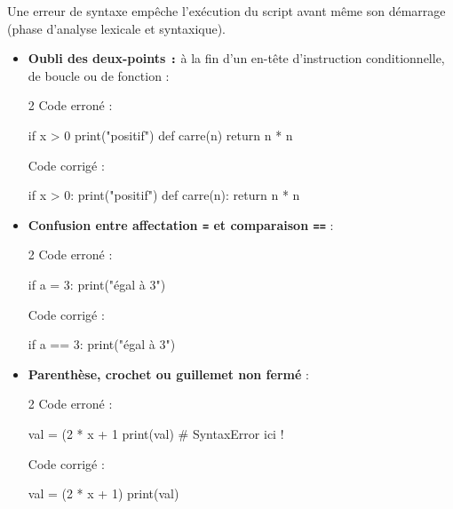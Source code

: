 \documentclass[11pt,a4paper]{article}
\begin{document}
\begin{tcolorbox}[left=0cm,title=\bf{\faBug \; 1. Erreurs de syntaxe (SyntaxError)},colbacktitle=cfond]
Une erreur de syntaxe empêche l'exécution du script avant même son démarrage (phase d'analyse lexicale et syntaxique).
\begin{itemize}
	\item[\textbullet] \textbf{Oubli des deux-points {\tt :}} à la fin d'un en-tête d'instruction conditionnelle, de boucle ou de fonction :
	\setlength{\multicolsep}{0pt}
	\begin{multicols}{2}
		\textcolor{BrickRed}{\faTimesCircle \; Code erroné :}
		\begin{python}
if x > 0
    print("positif")
def carre(n)
    return n * n
		\end{python}
		\textcolor{OliveGreen}{\faCheckCircle \; Code corrigé :}
		\begin{python}
if x > 0:
    print("positif")
def carre(n):
    return n * n
		\end{python}
	\end{multicols}

	\item[\textbullet] \textbf{Confusion entre affectation {\tt =} et comparaison {\tt ==}} :
	\begin{multicols}{2}
		\textcolor{BrickRed}{\faTimesCircle \; Code erroné :}
		\begin{python}
if a = 3:
    print("égal à 3")
		\end{python}
		\textcolor{OliveGreen}{\faCheckCircle \; Code corrigé :}
		\begin{python}
if a == 3:
    print("égal à 3")
		\end{python}
	\end{multicols}

	\item[\textbullet] \textbf{Parenthèse, crochet ou guillemet non fermé} :
	\begin{multicols}{2}
		\textcolor{BrickRed}{\faTimesCircle \; Code erroné :}
		\begin{python}
val = (2 * x + 1
print(val) # SyntaxError ici !
		\end{python}
		\textcolor{OliveGreen}{\faCheckCircle \; Code corrigé :}
		\begin{python}
val = (2 * x + 1)
print(val)
		\end{python}
	\end{multicols}


\end{itemize}
\end{tcolorbox}
\end{document}
